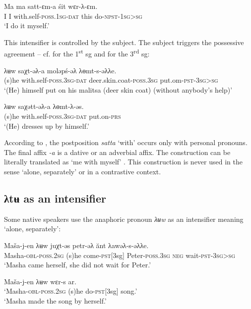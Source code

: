 \documentclass[output=paper]{langscibook}
\begin{document}
\ea 
\label{ex:Volkova:65}
 \gll Ma ma satt-ɛm-a  śit wɛr-λ-ɛm.\\
 I I with.self\textsc{{}-poss.1sg-dat} this do\textsc{{}-npst-1sg>sg}\\
 \glt ‘I do it myself.’
\z
 
This intensifier is controlled by the subject. The subject triggers the possessive agreement – cf.  for the 1\textsuperscript{st} sg and  for the 3\textsuperscript{rd} sg:


\ea 
\label{ex:Volkova:66}
	\ea
	\label{ex:Volkova:66a}
	   \gll λʉw saχt-əλ-a moləpś-əλ λɵmt-s-əλλe.\\
  	 (s)he with.self\textsc{{}-poss.3sg-dat} deer.skin.coat\textsc{{}-poss.3sg} put.om\textsc{{}-pst-3sg>sg}\\
  	 \glt ‘(He) himself put on his malitsa (deer skin coat) (without anybody’s help)’
  	 

	\ex
	\label{ex:Volkova:66b}
	\gll λʉw saχətt-əλ-a  λɵmt-λ-əs.\\
  	 (s)he with.self\textsc{{}-poss.3sg-dat} put.on\textsc{{}-prs}\\
  	 \glt ‘(He) dresses up by himself.’
  	
	\z
\z
 

According to \citet{Kaksin2007}, the postposition \textit{satta} ‘with’ occurs only with personal pronouns. The final affix \textit{{}-a} is a dative or an adverbial affix. The construction can be literally translated as ‘me with myself’ \citep[93]{Kaksin2007}. This construction is never used in the sense ‘alone, separately’ or in a contrastive context.

\subsection{ λt{ʉ} {as} {an} {intensifier}}\label{sec:Volkova:7.2}

Some native speakers use the anaphoric pronoun \textit{λʉw} as an intensifier meaning ‘alone, separately’:

\ea 
\label{ex:Volkova:67}
 \gll Maša-j-en  λʉw juχt-əs petr-əλ ănt λawəλ{}-s{}-əλλe.\\
 Masha\textsc{{}-obl-poss.2sg} (s)he come\textsc{{}-pst[}3sg] Peter\textsc{{}-poss.3sg} \textsc{neg} wait\textsc{{}-pst-3sg>sg}\\
 \glt ‘Masha came herself, she did not wait for Peter.’
\z
 
\ea 
\label{ex:Volkova:68}
 \gll Maša-j-en  λʉw wɛr-s ar.\\
 ‘Masha\textsc{{}-obl-poss.2sg} (s)he do\textsc{{}-pst[}3sg] song.’\\
 \glt ‘Masha made the song by herself.’
\z
 
\end{document}
